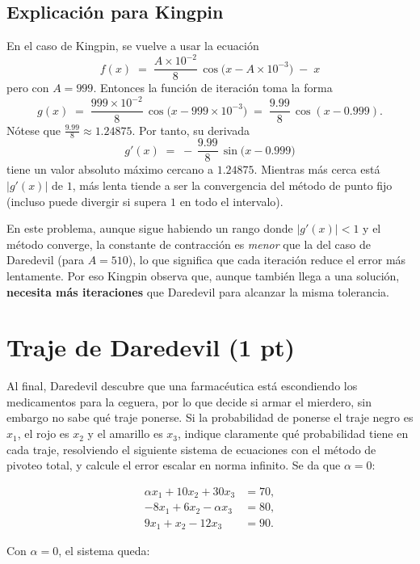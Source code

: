 \subsection{Explicación para Kingpin}

En el caso de Kingpin, se vuelve a usar la ecuación 
\[
f(x) \;=\; \frac{A \times 10^{-2}}{8}\,\cos\bigl(x - A \times 10^{-3}\bigr) \;-\; x
\]
pero con \(A=999\). Entonces la función de iteración toma la forma
\[
g(x) \;=\;\frac{999 \times 10^{-2}}{8}\,\cos\bigl(x - 999\times 10^{-3}\bigr)
\;=\;\frac{9.99}{8}\,\cos(x - 0.999).
\]
Nótese que \(\frac{9.99}{8}\approx 1.24875\). Por tanto, su derivada
\[
g'(x) \;=\;-\,\frac{9.99}{8}\,\sin\bigl(x - 0.999\bigr)
\]
tiene un valor absoluto máximo cercano a \(1.24875\). Mientras más cerca está \(\lvert g'(x)\rvert\) de \(1\), más lenta tiende a ser la convergencia del método de punto fijo (incluso puede divergir si supera \(1\) en todo el intervalo). 

En este problema, aunque sigue habiendo un rango donde \(\lvert g'(x)\rvert<1\) y el método converge, la constante de contracción es \textit{menor} que la del caso de Daredevil (para \(A=510\)), lo que significa que cada iteración reduce el error más lentamente. Por eso Kingpin observa que, aunque también llega a una solución, \textbf{necesita más iteraciones} que Daredevil para alcanzar la misma tolerancia.



\section{Traje de Daredevil (1 pt)}

Al final, Daredevil descubre que una farmacéutica está escondiendo los
medicamentos para la ceguera, por lo que decide si armar el mierdero, sin
embargo no sabe qué traje ponerse. Si la probabilidad de ponerse el traje negro es 
\(x_1\), el rojo es \(x_2\) y el amarillo es \(x_3\), indique claramente qué
probabilidad tiene en cada traje, resolviendo el siguiente sistema de ecuaciones
con el método de pivoteo total, y calcule el error escalar en norma infinito. 
Se da que \(\alpha = 0\):

\begin{align*}
   \alpha x_1 + 10x_2 + 30x_3 &= 70,\\
    -8x_1 + 6x_2 - \alpha x_3 &= 80,\\
    9x_1 + x_2 - 12x_3 &= 90.
\end{align*}

Con \(\alpha = 0\), el sistema queda:

